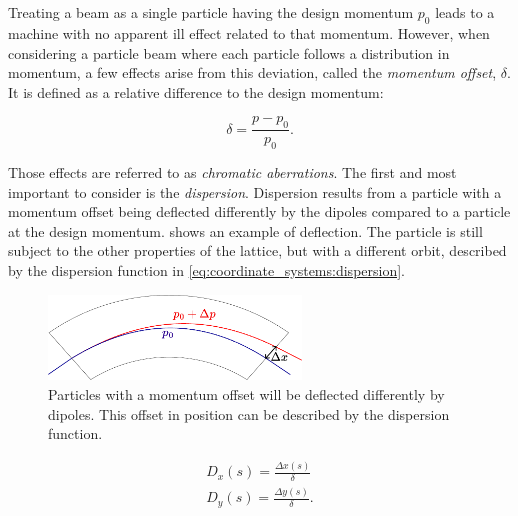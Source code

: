 \section{}

\subsection{}

Treating a beam as a single particle having the design momentum $p_0$ leads to a machine with no
apparent ill effect related to that momentum.
However, when considering a particle beam where each particle follows a distribution in
momentum, a few effects arise from this deviation, called the \textit{momentum offset},
$\delta$. It is defined as a relative difference to the design momentum:

\begin{equation}
    \delta = \frac{p - p_0}{p_0}.
    \label{eq:coordinate_systems:momentum_offset}
\end{equation}

Those effects are referred to as \textit{chromatic aberrations}. The first and most important to
consider is the \textit{dispersion}. Dispersion results from a particle with a momentum offset
being deflected differently by the dipoles compared to a particle at the design momentum.
 shows an example of deflection. 
The particle is still subject to the other properties of the lattice, but with a different orbit,
described by the dispersion function in \cref{eq:coordinate_systems:dispersion}.

\begin{figure}[!htb]
    \centering
    \includegraphics[width=0.6\textwidth]{images/dipole.pdf}
    \caption{Particles with a momentum offset will be deflected differently by dipoles. This offset
            in position can be described by the dispersion function.}
    \label{fig:coordinate_systems:dispersion}
\end{figure}

\begin{equation}
    \begin{aligned}
    D_x(s) = \frac{\Delta x(s)}{\delta} \\
    D_y(s) = \frac{\Delta y(s)}{\delta}.
    \end{aligned}
    \label{eq:coordinate_systems:dispersion}
\end{equation}

